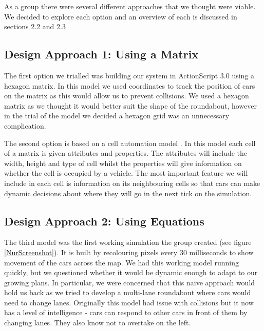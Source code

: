 \documentclass[11pt]{article}
\begin{document}
		\noindent As a group there were several different approaches that we thought were viable. 
		We decided to explore each option and an overview of each is discussed in sections 2.2 and 2.3

		
	\subsection{Design Approach 1: Using a Matrix}

	

	The first option we trialled was building our system in ActionScript 3.0 using a hexagon matrix. 
	In this model we used coordinates to track the position of cars on the matrix as this would allow us to prevent collisions. 
	We used a hexagon matrix as we thought it would better suit the shape of the roundabout, however in the trial of the model we decided a hexagon grid was an unnecessary complication. 
	
	
	The second option is based on a cell automation model \cite{namekawa2005general}. 
	In this model each cell of a matrix is given attributes and properties. 
	The attributes will include the width, height and type of cell whilst the properties will give information on whether the cell is occupied by a vehicle. 
	The most important feature we will include in each cell is information on its neighbouring cells so that cars can make dynamic decisions about where they will go in the next tick on the simulation.
	
	
	\subsection{Design Approach 2: Using Equations}
	\FloatBarrier
	
	
    The third model was the first working simulation the group created (see figure \ref{NurScreenshot}). 
    It is built by recolouring pixels every 30 milliseconds to show movement of the cars across the map. 
    We had this working model running quickly, but we questioned whether it would be dynamic enough to adapt to our growing plans. 
    In particular, we were concerned that this naive approach would hold us back as we tried to develop a multi-lane roundabout where cars would need to change lanes. 
	Originally this model had issue with collisions but it now has a level of intelligence - cars can respond to other cars in front of them by changing lanes. 
    They also know not to overtake on the left. 	
\end{document}
